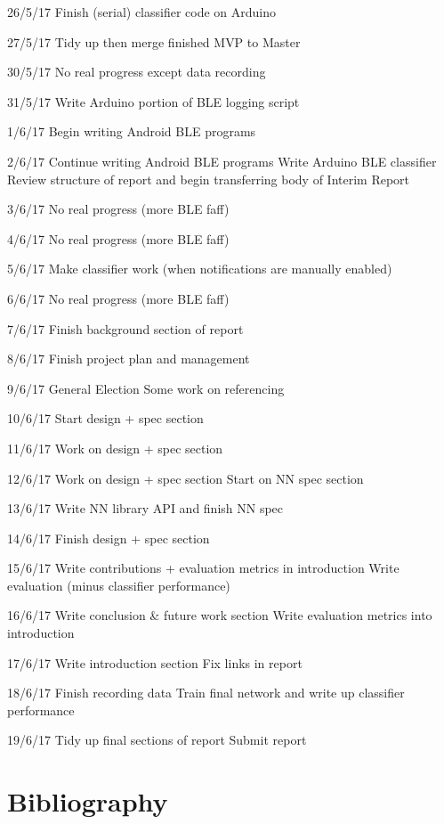\documentclass[a4paper]{article}
\begin{document}
26/5/17
    Finish (serial) classifier code on Arduino

27/5/17
    Tidy up then merge finished MVP to Master

30/5/17
    No real progress except data recording

31/5/17
    Write Arduino portion of BLE logging script

1/6/17
    Begin writing Android BLE programs

2/6/17
    Continue writing Android BLE programs
    Write Arduino BLE classifier
    Review structure of report and begin transferring body of Interim Report

3/6/17
    No real progress (more BLE faff)

4/6/17
    No real progress (more BLE faff)

5/6/17
    Make classifier work (when notifications are manually enabled)

6/6/17
    No real progress (more BLE faff)

7/6/17
    Finish background section of report

8/6/17
    Finish project plan and management

9/6/17
    General Election
    Some work on referencing
    
10/6/17
    Start design + spec section

11/6/17
    Work on design + spec section

12/6/17
    Work on design + spec section
    Start on NN spec section

13/6/17
    Write NN library API and finish NN spec

14/6/17
    Finish design + spec section

15/6/17
    Write contributions + evaluation metrics in introduction
    Write evaluation (minus classifier performance)

16/6/17
    Write conclusion \& future work section
    Write evaluation metrics into introduction

17/6/17
    Write introduction section
    Fix links in report

18/6/17
    Finish recording data
    Train final network and write up classifier performance

19/6/17
    Tidy up final sections of report
    Submit report

\newpage
\section{Bibliography}
\label{sec:bi}
\end{document}

